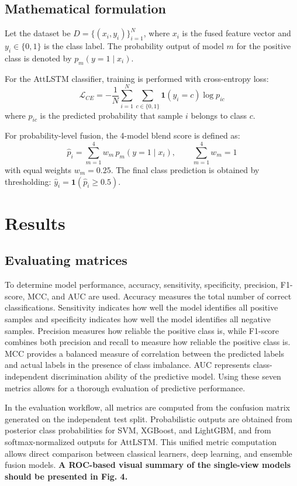 \documentclass[11pt]{article}
\begin{document}
\subsection{Mathematical formulation}
Let the dataset be $D=\{(x_i,y_i)\}_{i=1}^{N}$, where $x_i$ is the fused feature vector and $y_i\in\{0,1\}$ is the class label. The probability output of model $m$ for the positive class is denoted by $p_m(y=1\mid x_i)$.

For the AttLSTM classifier, training is performed with cross-entropy loss:
\begin{equation}
\mathcal{L}_{CE}=-\frac{1}{N}\sum_{i=1}^{N}\sum_{c\in\{0,1\}}\mathbf{1}(y_i=c)\log p_{ic}
\end{equation}
where $p_{ic}$ is the predicted probability that sample $i$ belongs to class $c$.

For probability-level fusion, the 4-model blend score is defined as:
\begin{equation}
\hat{p}_i=\sum_{m=1}^{4} w_m\,p_m(y=1\mid x_i),\qquad \sum_{m=1}^{4} w_m=1
\end{equation}
with equal weights $w_m=0.25$. The final class prediction is obtained by thresholding: $\hat{y}_i=\mathbf{1}(\hat{p}_i\ge 0.5)$.

\section{Results}
\subsection{Evaluating matrices}
To determine model performance, accuracy, sensitivity, specificity, precision, F1-score, MCC, and AUC are used. Accuracy measures the total number of correct classifications. Sensitivity indicates how well the model identifies all positive samples and specificity indicates how well the model identifies all negative samples. Precision measures how reliable the positive class is, while F1-score combines both precision and recall to measure how reliable the positive class is. MCC provides a balanced measure of correlation between the predicted labels and actual labels in the presence of class imbalance. AUC represents class-independent discrimination ability of the predictive model. Using these seven metrics allows for a thorough evaluation of predictive performance.

In the evaluation workflow, all metrics are computed from the confusion matrix generated on the independent test split. Probabilistic outputs are obtained from posterior class probabilities for SVM, XGBoost, and LightGBM, and from softmax-normalized outputs for AttLSTM. This unified metric computation allows direct comparison between classical learners, deep learning, and ensemble fusion models. \textbf{A ROC-based visual summary of the single-view models should be presented in Fig. 4.}
\end{document}
